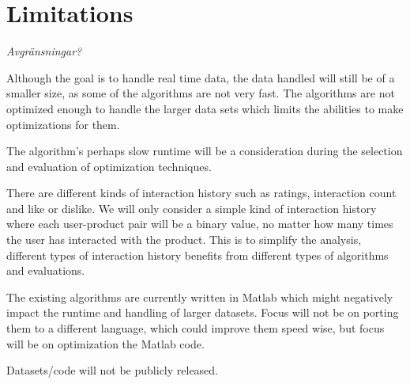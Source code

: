 
\section{Limitations}\label{sec:intro:limitations}

\textit{Avgränsningar?}

Although the goal is to handle real time data, the data handled will still be of a smaller size, as some of the algorithms are not very fast. The algorithms are not optimized enough to handle the larger data sets which limits the abilities to make optimizations for them.

The algorithm's perhaps slow runtime will be a consideration during the selection and evaluation of optimization techniques.

There are different kinds of interaction history such as ratings, interaction count and like or dislike. We will only consider a simple kind of interaction history where each user-product pair will be a binary value, no matter how many times the user has interacted with the product. This is to simplify the analysis, different types of interaction history benefits from different types of algorithms and evaluations.

The existing algorithms are currently written in Matlab which might negatively impact the runtime and handling of larger datasets. Focus will not be on porting them to a different language, which could improve them speed wise, but focus will be on optimization the Matlab code.

Datasets/code will not be publicly released.

